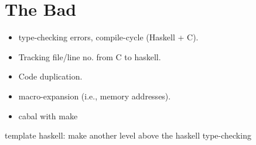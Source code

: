 \section{The Bad}


\begin{itemize}
\item type-checking errors, compile-cycle (Haskell + C). 
\item Tracking file/line no. from C to haskell.
\item Code duplication.
\item macro-expansion (i.e., memory addresses).
\item cabal with make
\end{itemize}

template haskell: make another level above the haskell type-checking

